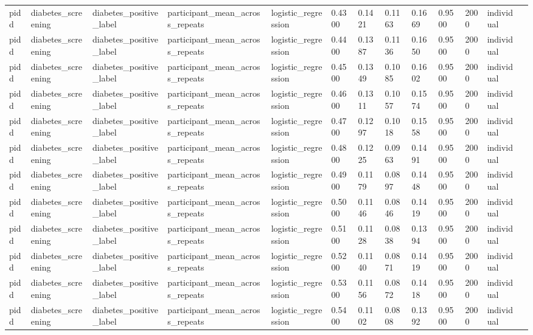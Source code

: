 \begin{tabular}{lllllllllllll}
pidd & diabetes\_screening & diabetes\_positive\_label & participant\_mean\_across\_repeats & logistic\_regression & 0.4300 & 0.1421 & 0.1163 & 0.1669 & 0.9500 & 2000 & individual &  \\
pidd & diabetes\_screening & diabetes\_positive\_label & participant\_mean\_across\_repeats & logistic\_regression & 0.4400 & 0.1387 & 0.1136 & 0.1650 & 0.9500 & 2000 & individual &  \\
pidd & diabetes\_screening & diabetes\_positive\_label & participant\_mean\_across\_repeats & logistic\_regression & 0.4500 & 0.1349 & 0.1085 & 0.1602 & 0.9500 & 2000 & individual &  \\
pidd & diabetes\_screening & diabetes\_positive\_label & participant\_mean\_across\_repeats & logistic\_regression & 0.4600 & 0.1311 & 0.1057 & 0.1574 & 0.9500 & 2000 & individual &  \\
pidd & diabetes\_screening & diabetes\_positive\_label & participant\_mean\_across\_repeats & logistic\_regression & 0.4700 & 0.1297 & 0.1018 & 0.1558 & 0.9500 & 2000 & individual &  \\
pidd & diabetes\_screening & diabetes\_positive\_label & participant\_mean\_across\_repeats & logistic\_regression & 0.4800 & 0.1225 & 0.0963 & 0.1491 & 0.9500 & 2000 & individual &  \\
pidd & diabetes\_screening & diabetes\_positive\_label & participant\_mean\_across\_repeats & logistic\_regression & 0.4900 & 0.1179 & 0.0897 & 0.1448 & 0.9500 & 2000 & individual &  \\
pidd & diabetes\_screening & diabetes\_positive\_label & participant\_mean\_across\_repeats & logistic\_regression & 0.5000 & 0.1146 & 0.0846 & 0.1419 & 0.9500 & 2000 & individual &  \\
pidd & diabetes\_screening & diabetes\_positive\_label & participant\_mean\_across\_repeats & logistic\_regression & 0.5100 & 0.1128 & 0.0838 & 0.1394 & 0.9500 & 2000 & individual &  \\
pidd & diabetes\_screening & diabetes\_positive\_label & participant\_mean\_across\_repeats & logistic\_regression & 0.5200 & 0.1140 & 0.0871 & 0.1419 & 0.9500 & 2000 & individual &  \\
pidd & diabetes\_screening & diabetes\_positive\_label & participant\_mean\_across\_repeats & logistic\_regression & 0.5300 & 0.1156 & 0.0872 & 0.1418 & 0.9500 & 2000 & individual &  \\
pidd & diabetes\_screening & diabetes\_positive\_label & participant\_mean\_across\_repeats & logistic\_regression & 0.5400 & 0.1102 & 0.0808 & 0.1392 & 0.9500 & 2000 & individual &  \\

\end{tabular}
